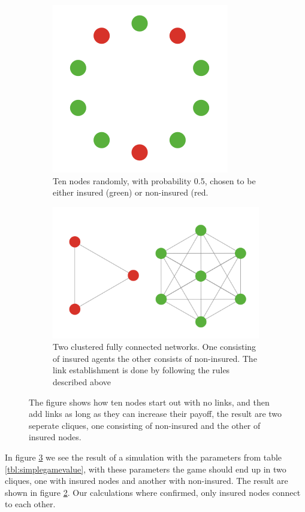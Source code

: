 \begin{figure}[h]
\centering
\begin{subfigure}{.5\textwidth}
  \centering
  \includegraphics[width=0.4\linewidth]{../Figures/FirstSimulationStart.png}
  \caption{\label{fig:firstsimulationstart} Ten nodes randomly, with probability 0.5, chosen to be either insured (green) or non-insured (red.}
\end{subfigure}
\quad
\begin{subfigure}{.46\textwidth}
  \centering
  \includegraphics[width=0.8\linewidth]{../Figures/FirstSimulationResult.png}
  \caption{\label{fig:firstsimulationresult} Two clustered fully connected networks. One consisting of insured agents the other consists of non-insured. The link establishment is done by following the rules described above}
\end{subfigure}
\caption{\label{fig:firstsimulation} The figure shows how ten nodes start out with no links, and then add links as long as they can increase their payoff, the result are two seperate cliques, one consisting of non-insured and the other of insured nodes.}
\end{figure}
In figure \ref{fig:firstsimulation} we see the result of a simulation with the parameters from table \ref{tbl:simplegamevalue}, with these parameters the game should end up in two cliques, one with insured nodes and another with non-insured. The result are shown in figure \ref{fig:firstsimulationresult}. Our calculations where confirmed, only insured nodes connect to each other.  
